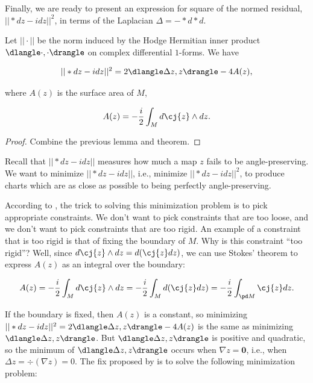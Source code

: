 Finally, we are ready to present an expression for square of the normed residual, $||*dz - idz||^2$, in terms of the Laplacian $\Delta = -*d*d$.

\begin{theorem}
    Let $||\cdot||$ be the norm induced by the Hodge Hermitian inner product $\dlangle \cdot, \cdot \drangle$ on complex differential $1$-forms. We have

    \begin{align*}
        ||*dz - idz||^2 = 2\dlangle \Delta z, z \drangle - 4A(z),
    \end{align*}
    
    where $A(z)$ is the surface area of $M$, 
    
    \begin{align*}
        A(z) = -\frac{i}{2} \int_M d \cj{z} \wedge dz.
    \end{align*}
\end{theorem}

\begin{proof}
    Combine the previous lemma and theorem.
\end{proof}

Recall that $||*dz - idz||$ measures how much a map $z$ fails to be angle-preserving. We want to minimize $||*dz - idz||$, i.e., minimize $||*dz - idz||^2$, to produce charts which are as close as possible to being perfectly angle-preserving.

According to \cite[p. 126]{book::DDG}, the trick to solving this minimization problem is to pick appropriate constraints. We don't want to pick constraints that are too loose, and we don't want to pick constraints that are too rigid. An example of a constraint that is too rigid is that of fixing the boundary of $M$. Why is this constraint ``too rigid''? Well, since $d\cj{z} \wedge dz = d(\cj{z} dz)$, we can use Stokes' theorem to express $A(z)$ as an integral over the boundary:

\begin{align*}
    A(z) = -\frac{i}{2} \int_M d \cj{z} \wedge dz = -\frac{i}{2} \int_M d(\cj{z} dz) = -\frac{i}{2} \int_{\pd M} \cj{z} dz.
\end{align*}

If the boundary is fixed, then $A(z)$ is a constant, so minimizing $||*dz - idz||^2 = 2\dlangle \Delta z, z \drangle - 4A(z)$ is the same as minimizing $\dlangle \Delta z, z \drangle$. But $\dlangle \Delta z, z \drangle$ is positive and quadratic, so the minimum of $\dlangle \Delta z, z \drangle$ occurs when $\nabla z = \mathbf{0}$, i.e., when $\Delta z = \div(\nabla z) = 0$. The fix proposed by \cite{book::DDG} is to solve the following minimization problem:

